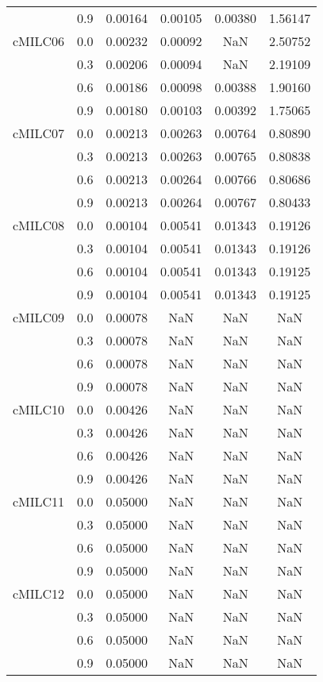 \begin{longtable}{cccccc}
        & 0.9 & 0.00164 & 0.00105 & 0.00380 & 1.56147 \\
cMILC06 & 0.0 & 0.00232 & 0.00092 & NaN & 2.50752 \\
        & 0.3 & 0.00206 & 0.00094 & NaN & 2.19109 \\
        & 0.6 & 0.00186 & 0.00098 & 0.00388 & 1.90160 \\
        & 0.9 & 0.00180 & 0.00103 & 0.00392 & 1.75065 \\
cMILC07 & 0.0 & 0.00213 & 0.00263 & 0.00764 & 0.80890 \\
        & 0.3 & 0.00213 & 0.00263 & 0.00765 & 0.80838 \\
        & 0.6 & 0.00213 & 0.00264 & 0.00766 & 0.80686 \\
        & 0.9 & 0.00213 & 0.00264 & 0.00767 & 0.80433 \\
cMILC08 & 0.0 & 0.00104 & 0.00541 & 0.01343 & 0.19126 \\
        & 0.3 & 0.00104 & 0.00541 & 0.01343 & 0.19126 \\
        & 0.6 & 0.00104 & 0.00541 & 0.01343 & 0.19125 \\
        & 0.9 & 0.00104 & 0.00541 & 0.01343 & 0.19125 \\
cMILC09 & 0.0 & 0.00078 & NaN & NaN & NaN \\
        & 0.3 & 0.00078 & NaN & NaN & NaN \\
        & 0.6 & 0.00078 & NaN & NaN & NaN \\
        & 0.9 & 0.00078 & NaN & NaN & NaN \\
cMILC10 & 0.0 & 0.00426 & NaN & NaN & NaN \\
        & 0.3 & 0.00426 & NaN & NaN & NaN \\
        & 0.6 & 0.00426 & NaN & NaN & NaN \\
        & 0.9 & 0.00426 & NaN & NaN & NaN \\
cMILC11 & 0.0 & 0.05000 & NaN & NaN & NaN \\
        & 0.3 & 0.05000 & NaN & NaN & NaN \\
        & 0.6 & 0.05000 & NaN & NaN & NaN \\
        & 0.9 & 0.05000 & NaN & NaN & NaN \\
cMILC12 & 0.0 & 0.05000 & NaN & NaN & NaN \\
        & 0.3 & 0.05000 & NaN & NaN & NaN \\
        & 0.6 & 0.05000 & NaN & NaN & NaN \\
        & 0.9 & 0.05000 & NaN & NaN & NaN \\
\end{longtable}

